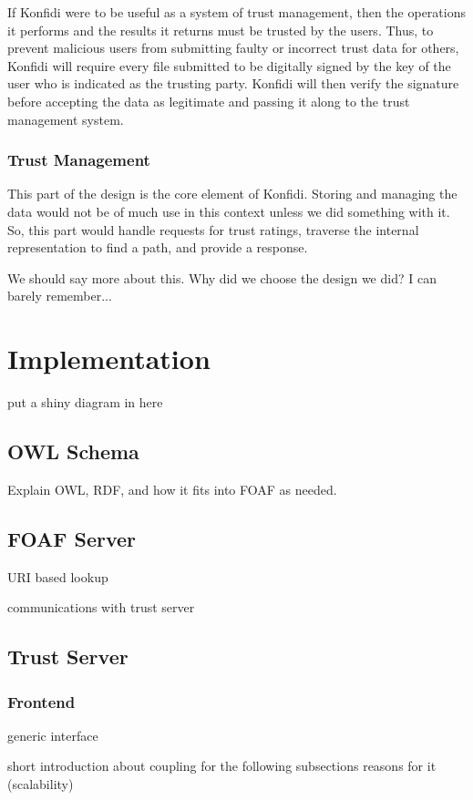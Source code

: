 \documentclass{acm_proc_article-sp}
\begin{document}
If Konfidi were to be useful as a system of trust management, then the operations it performs and the results it returns must be trusted by the users.  Thus, to prevent malicious users from submitting faulty or incorrect trust data for others, Konfidi will require every file submitted to be digitally signed by the key of the user who is indicated as the trusting party.  Konfidi will then verify the signature before accepting the data as legitimate and passing it along to the trust management system.

\subsubsection{Trust Management}
This part of the design is the core element of Konfidi.  Storing and managing the data would not be of much use in this context unless we did something with it.  So, this part would handle requests for trust ratings, traverse the internal representation to find a path, and provide a response.  

We should say more about this.  Why did we choose the design we did?  I can barely remember...

\section{Implementation}
put a shiny diagram in here

\subsection{OWL Schema}
Explain OWL, RDF, and how it fits into FOAF as needed.

\subsection{FOAF Server}
URI based lookup

communications with trust server

\subsection{Trust Server}

\subsubsection{Frontend}
generic interface

short introduction about coupling for the following subsections
reasons for it (scalability)
\end{document}
